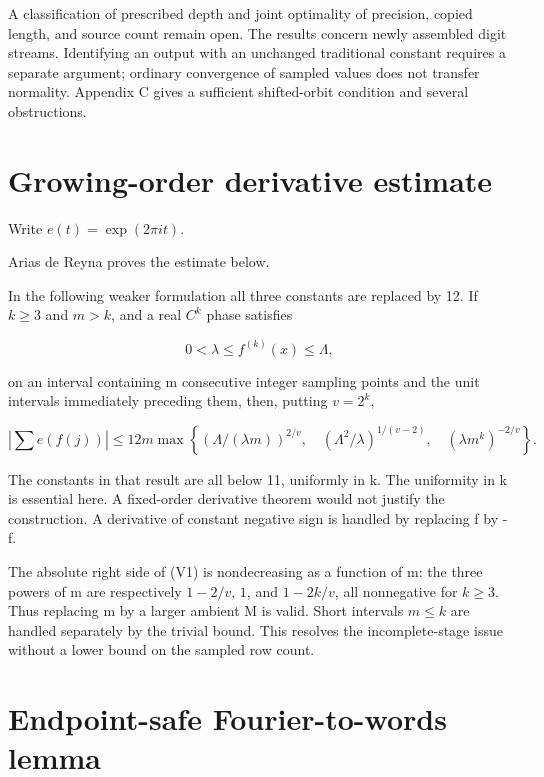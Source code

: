 \documentclass[11pt,a4paper]{article}
\begin{document}
A classification of prescribed depth and joint optimality of precision,
copied length, and source count remain open. The results concern newly
assembled digit streams. Identifying an output with an unchanged
traditional constant requires a separate argument; ordinary convergence
of sampled values does not transfer normality. Appendix C gives a
sufficient shifted-orbit condition and several obstructions.

\appendix

\section{Growing-order derivative
estimate}\label{growing-order-derivative-estimate}

Write \(e(t)=\exp(2\pi i t)\).

Arias de Reyna
\cite[Theorem 11, equation (15), and Remark 14, equation (19)]{arias}
proves the estimate below.

In the following weaker formulation all three constants are replaced by
12. If \(k\ge3\) and \(m>k\), and a real \(C^k\) phase satisfies

\[
0< \lambda\le f^{(k)}(x)\le\Lambda,
\]

on an interval containing m consecutive integer sampling points and the
unit intervals immediately preceding them, then, putting \(v=2^k\),

\[
\left|\sum e(f(j))\right|
 \le12m\max\left\lbrace 
  (\Lambda/(\lambda m))^{2/v},\quad
  (\Lambda^2/\lambda)^{1/(v-2)},\quad
  (\lambda m^k)^{-2/v}\right\rbrace .                 \tag{V1}
\]

The constants in that result are all below 11, uniformly in k. The
uniformity in k is essential here. A fixed-order derivative theorem
would not justify the construction. A derivative of constant negative
sign is handled by replacing f by -f.

The absolute right side of (V1) is nondecreasing as a function of m: the
three powers of m are respectively \(1-2/v\), \(1\), and \(1-2k/v\), all
nonnegative for \(k\ge3\). Thus replacing m by a larger ambient M is
valid. Short intervals \(m\le k\) are handled separately by the trivial
bound. This resolves the incomplete-stage issue without a lower bound on
the sampled row count.

\section{Endpoint-safe Fourier-to-words
lemma}\label{endpoint-safe-fourier-to-words-lemma}
\end{document}

